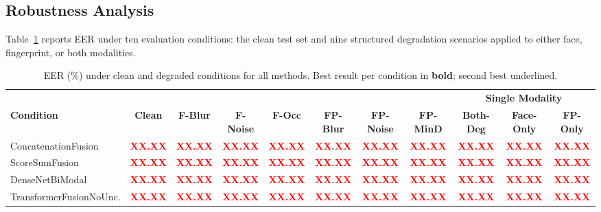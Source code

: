 \documentclass[10pt,journal,compsoc]{IEEEtran}
\begin{document}
\subsection{Robustness Analysis}
\label{subsec:robustness}

Table~\ref{tab:robustness} reports EER under ten evaluation conditions: the clean test set and nine structured degradation scenarios applied to either face, fingerprint, or both modalities.

\begin{table}[htbp]
\centering
\caption{EER (\%) under clean and degraded conditions for all methods. Best result per condition in \textbf{bold}; second best underlined.}
\label{tab:robustness}
\begin{tabular}{l | c | c c c c c c | c c c}
\hline
& & & & & & & & \multicolumn{3}{c}{\textbf{Single Modality}} \\
\textbf{Condition} & \textbf{Clean} & \textbf{F-Blur} & \textbf{F-Noise} & \textbf{F-Occ} & \textbf{FP-Blur} & \textbf{FP-Noise} & \textbf{FP-MinD} & \textbf{Both-Deg} & \textbf{Face-Only} & \textbf{FP-Only} \\
\hline
ConcatenationFusion & \textcolor{red}{\textbf{XX.XX}} & \textcolor{red}{\textbf{XX.XX}} & \textcolor{red}{\textbf{XX.XX}} & \textcolor{red}{\textbf{XX.XX}} & \textcolor{red}{\textbf{XX.XX}} & \textcolor{red}{\textbf{XX.XX}} & \textcolor{red}{\textbf{XX.XX}} & \textcolor{red}{\textbf{XX.XX}} & \textcolor{red}{\textbf{XX.XX}} & \textcolor{red}{\textbf{XX.XX}} \\ %
ScoreSumFusion & \textcolor{red}{\textbf{XX.XX}} & \textcolor{red}{\textbf{XX.XX}} & \textcolor{red}{\textbf{XX.XX}} & \textcolor{red}{\textbf{XX.XX}} & \textcolor{red}{\textbf{XX.XX}} & \textcolor{red}{\textbf{XX.XX}} & \textcolor{red}{\textbf{XX.XX}} & \textcolor{red}{\textbf{XX.XX}} & \textcolor{red}{\textbf{XX.XX}} & \textcolor{red}{\textbf{XX.XX}} \\ %
DenseNetBiModal & \textcolor{red}{\textbf{XX.XX}} & \textcolor{red}{\textbf{XX.XX}} & \textcolor{red}{\textbf{XX.XX}} & \textcolor{red}{\textbf{XX.XX}} & \textcolor{red}{\textbf{XX.XX}} & \textcolor{red}{\textbf{XX.XX}} & \textcolor{red}{\textbf{XX.XX}} & \textcolor{red}{\textbf{XX.XX}} & \textcolor{red}{\textbf{XX.XX}} & \textcolor{red}{\textbf{XX.XX}} \\ %
TransformerFusionNoUnc. & \textcolor{red}{\textbf{XX.XX}} & \textcolor{red}{\textbf{XX.XX}} & \textcolor{red}{\textbf{XX.XX}} & \textcolor{red}{\textbf{XX.XX}} & \textcolor{red}{\textbf{XX.XX}} & \textcolor{red}{\textbf{XX.XX}} & \textcolor{red}{\textbf{XX.XX}} & \textcolor{red}{\textbf{XX.XX}} & \textcolor{red}{\textbf{XX.XX}} & \textcolor{red}{\textbf{XX.XX}} \\ %

\end{tabular}
\end{table}
\end{document}
